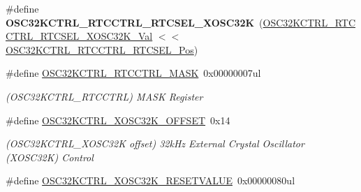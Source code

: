 \begin{DoxyCompactItemize}
\item 
\hypertarget{group___s_a_m_l21___o_s_c32_k_c_t_r_l_gaab04e1f8b1bd6a65de6ca3c58c945a4a}{}\#define {\bfseries O\+S\+C32\+K\+C\+T\+R\+L\+\_\+\+R\+T\+C\+C\+T\+R\+L\+\_\+\+R\+T\+C\+S\+E\+L\+\_\+\+X\+O\+S\+C32\+K}~(\hyperlink{group___s_a_m_l21___o_s_c32_k_c_t_r_l_ga3a4fae30686693a728ec790fa0bde8e6}{O\+S\+C32\+K\+C\+T\+R\+L\+\_\+\+R\+T\+C\+C\+T\+R\+L\+\_\+\+R\+T\+C\+S\+E\+L\+\_\+\+X\+O\+S\+C32\+K\+\_\+\+Val} $<$$<$ \hyperlink{group___s_a_m_l21___o_s_c32_k_c_t_r_l_gadcfbd528df699f49aa94aed33cfa1324}{O\+S\+C32\+K\+C\+T\+R\+L\+\_\+\+R\+T\+C\+C\+T\+R\+L\+\_\+\+R\+T\+C\+S\+E\+L\+\_\+\+Pos})\label{group___s_a_m_l21___o_s_c32_k_c_t_r_l_gaab04e1f8b1bd6a65de6ca3c58c945a4a}

\item 
\hypertarget{group___s_a_m_l21___o_s_c32_k_c_t_r_l_gaa679222a2941c8283211ffdc4f5a7899}{}\#define \hyperlink{group___s_a_m_l21___o_s_c32_k_c_t_r_l_gaa679222a2941c8283211ffdc4f5a7899}{O\+S\+C32\+K\+C\+T\+R\+L\+\_\+\+R\+T\+C\+C\+T\+R\+L\+\_\+\+M\+A\+S\+K}~0x00000007ul\label{group___s_a_m_l21___o_s_c32_k_c_t_r_l_gaa679222a2941c8283211ffdc4f5a7899}

\begin{DoxyCompactList}\small\item\em (O\+S\+C32\+K\+C\+T\+R\+L\+\_\+\+R\+T\+C\+C\+T\+R\+L) M\+A\+S\+K Register \end{DoxyCompactList}\item 
\hypertarget{group___s_a_m_l21___o_s_c32_k_c_t_r_l_ga4c8965d920445c75c0c2c3ef28b2a642}{}\#define \hyperlink{group___s_a_m_l21___o_s_c32_k_c_t_r_l_ga4c8965d920445c75c0c2c3ef28b2a642}{O\+S\+C32\+K\+C\+T\+R\+L\+\_\+\+X\+O\+S\+C32\+K\+\_\+\+O\+F\+F\+S\+E\+T}~0x14\label{group___s_a_m_l21___o_s_c32_k_c_t_r_l_ga4c8965d920445c75c0c2c3ef28b2a642}

\begin{DoxyCompactList}\small\item\em (O\+S\+C32\+K\+C\+T\+R\+L\+\_\+\+X\+O\+S\+C32\+K offset) 32k\+Hz External Crystal Oscillator (X\+O\+S\+C32\+K) Control \end{DoxyCompactList}\item 
\hypertarget{group___s_a_m_l21___o_s_c32_k_c_t_r_l_ga387f876de09ea1649ef2298d27e83c00}{}\#define \hyperlink{group___s_a_m_l21___o_s_c32_k_c_t_r_l_ga387f876de09ea1649ef2298d27e83c00}{O\+S\+C32\+K\+C\+T\+R\+L\+\_\+\+X\+O\+S\+C32\+K\+\_\+\+R\+E\+S\+E\+T\+V\+A\+L\+U\+E}~0x00000080ul\label{group___s_a_m_l21___o_s_c32_k_c_t_r_l_ga387f876de09ea1649ef2298d27e83c00}


\end{DoxyCompactItemize}
